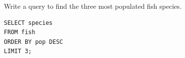 \begin{blocksection}
Write a query to find the three most populated fish species.

\begin{solution}[0.7in]
\begin{lstlisting}
SELECT species 
FROM fish 
ORDER BY pop DESC 
LIMIT 3;
\end{lstlisting}
\end{solution}
\end{blocksection}
